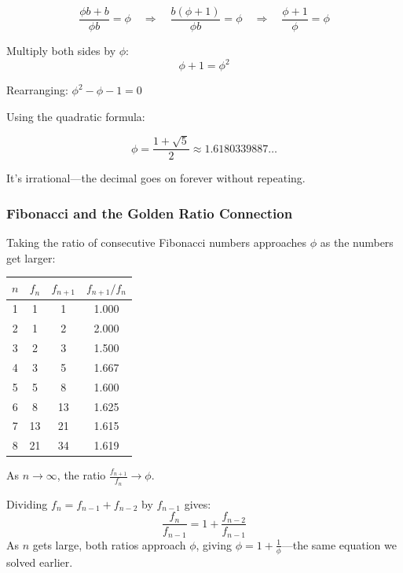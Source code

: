 \documentclass[11pt,a4paper]{article}
\begin{document}
$$\frac{\phi b + b}{\phi b} = \phi \quad\Rightarrow\quad \frac{b(\phi + 1)}{\phi b} = \phi \quad\Rightarrow\quad \frac{\phi + 1}{\phi} = \phi$$

Multiply both sides by $\phi$:
$$\phi + 1 = \phi^2$$

Rearranging: $\phi^2 - \phi - 1 = 0$

Using the quadratic formula:

\begin{formulabox}
$$\phi = \frac{1 + \sqrt{5}}{2} \approx 1.6180339887\ldots$$
\end{formulabox}

It's irrational---the decimal goes on forever without repeating.

\subsubsection{Fibonacci and the Golden Ratio Connection}

Taking the ratio of consecutive Fibonacci numbers approaches $\phi$ as the numbers get larger:

\begin{center}
\begin{tabular}{c|c|c|c}
\toprule
$n$ & $f_n$ & $f_{n+1}$ & $f_{n+1}/f_n$ \\
\midrule
1 & 1 & 1 & 1.000 \\
2 & 1 & 2 & 2.000 \\
3 & 2 & 3 & 1.500 \\
4 & 3 & 5 & 1.667 \\
5 & 5 & 8 & 1.600 \\
6 & 8 & 13 & 1.625 \\
7 & 13 & 21 & 1.615 \\
8 & 21 & 34 & 1.619 \\
\bottomrule
\end{tabular}
\end{center}

As $n \to \infty$, the ratio $\displaystyle\frac{f_{n+1}}{f_n} \to \phi$.

\begin{tipbox}
Dividing $f_n = f_{n-1} + f_{n-2}$ by $f_{n-1}$ gives:
$$\frac{f_n}{f_{n-1}} = 1 + \frac{f_{n-2}}{f_{n-1}}$$
As $n$ gets large, both ratios approach $\phi$, giving $\phi = 1 + \frac{1}{\phi}$---the same equation we solved earlier.
\end{tipbox}

\newpage

\end{document}
